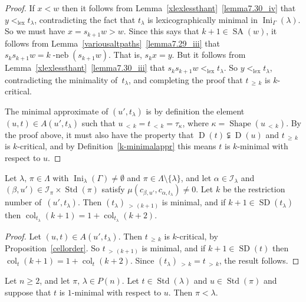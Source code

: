 \documentclass[ALCO,ThmDefs,Unicode,epreuves]{cedram}
\DeclareMathOperator{\Ini}{Ini}
\DeclareMathOperator{\lex}{lex}
\DeclareMathOperator{\col}{col}
\newcommand{\lessthan}[2]{#1\,{_{<\,#2}}}
\newcommand{\morethan}[2]{#1\,{_{>\,#2}}}
\newcommand{\Morethan}[2]{#1\,{_{\geqslant\,#2}}}
\DeclareMathOperator{\STD}{Std}
\DeclareMathOperator{\shape}{Shape}
\DeclareMathOperator{\neb}{-neb}
\DeclareMathOperator{\SD}{SD}
\DeclareMathOperator{\SA}{SA}
\DeclareMathOperator{\D}{D}
\begin{document}
\begin{proof}
If $x<w$ then it follows from Lemma~\ref{xlexlessthant}~\ref{lemma7.30_iv} that
$y<_{\lex}t_\lambda$, contradicting the fact that $t_\lambda$
is lexicographically minimal in $\Ini_\Gamma(\lambda)$.
So we must have $x=s_{k+1}w>w$. Since this says that $k+1\in\SA(w)$,
it follows from Lemma~\ref{variousaltpaths}~\ref{lemma7.29_iii} that
$s_ks_{k+1}w=k\neb(s_{k+1}w)$. That is, $s_kx=y$. But it
follows from Lemma~\ref{xlexlessthant}~\ref{lemma7.30_iii} that
$s_ks_{k+1}w<_{\lex}t_\lambda$. So $y<_{\lex}t_\lambda$,
contradicting the minimality of~$t_\lambda$, and completing the
proof that $\Morethan tk$ is $k$-critical.

The minimal approximate of $(u',t_\lambda)$ is by definition the
element $(u,t)\in A(u',t_\lambda)$ such that
$\lessthan uk=\lessthan tk=\tau_\kappa$, where
$\kappa=\shape(\lessthan uk)$. By the proof above, it
must also have the property that $\D(t)\subsetneqq\D(u)$ and
$\Morethan tk$ is $k$-critical, and by
Definition~\ref{k-minimalappr} this means $t$ is $k$-minimal
with respect to $u$.
\end{proof}

\begin{coro}\label{talphanystructure}
Let $\lambda,\,\pi\in\Lambda$ with $\Ini_\lambda(\Gamma)\ne\emptyset$ and
$\pi\in\Lambda\setminus\{\lambda\}$, and let $\alpha\in\mathcal I_\lambda$
and $(\beta,u')\in\mathcal I_\pi\times\STD(\pi)$ satisfy
$\mu(c_{\beta,u'},c_{\alpha,t_\lambda})\neq 0$.
Let $k$ be the restriction number of~$(u',t_\lambda)$.
Then $\morethan {(t_{\lambda})}{(k+1)}$ is minimal, and if $k+1\in\SD(t_{\lambda})$
then $\col_{t_{\lambda}}(k+1)=1+\col_{t_{\lambda}}(k+2)$.
\end{coro}

\begin{proof}
Let $(u,t)\in A(u',t_\lambda)$.
Then $\Morethan tk$ is $k$-critical, by Proposition~\ref{cellorder}. So
$\morethan t{(k+1)}$ is minimal, and if $k+1\in\SD(t)$ then
$\col_t(k+1)=1+\col_t(k+2)$. Since
$\morethan{(t_{\lambda})}k=\morethan tk$, the result follows.
\end{proof}

\begin{lemm}\label{1-minimalcomp}
Let $n\geq 2$, and let $\pi,\,\lambda\in P(n)$.
Let $t\in\STD(\lambda)$ and $u\in\STD(\pi)$ and suppose that $t$ is $1$-minimal with
respect to $u$. Then $\pi<\lambda$.
\end{lemm}
\end{document}
